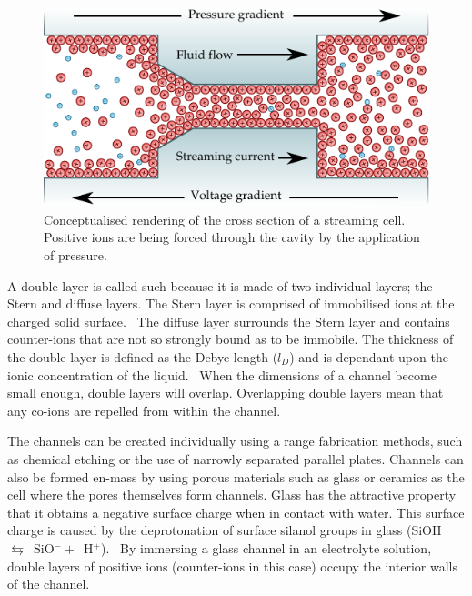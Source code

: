 \documentclass[10pt,final,journal]{IEEEtran}
\begin{document}
    \begin{figure}
        \begin{center}
        \includegraphics{diagram_streamingCellPrinciple}
        \end{center}
        \caption{Conceptualised rendering of the cross section of a streaming cell.
        Positive ions are being forced through the cavity by the application of pressure.}
        \label{fig:streamingPrinciple}
    \end{figure}

    A double layer is called such because it is made of two individual layers; the Stern and diffuse layers.
    The Stern layer is comprised of immobilised ions at the charged solid surface.~\cite{Salieb-Beugelaar2009}
    The diffuse layer surrounds the Stern layer and contains counter-ions that are not so strongly bound as to be immobile.
    The thickness of the double layer is defined as the Debye length ($l_{D}$) and is dependant upon the ionic concentration of the liquid.~\cite{Israelachvili2011}
    When the dimensions of a channel become small enough, double layers will overlap.
    Overlapping double layers mean that any co-ions are repelled from within the channel.

    The channels can be created individually using a range fabrication methods, such as chemical etching or the use of narrowly separated parallel plates.
    Channels can also be formed en-mass by using porous materials such as glass or ceramics as the cell where the pores themselves form channels.
    Glass has the attractive property that it obtains a negative surface charge when in contact with water.
    This surface charge is caused by the deprotonation of surface silanol groups in glass (SiOH~$\leftrightarrows$~SiO$^{-}+$~H$^{+}$).~\cite{Kirby2004a}
    By immersing a glass channel in an electrolyte solution, double layers of positive ions (counter-ions in this case) occupy the interior walls of the channel.
\end{document}
